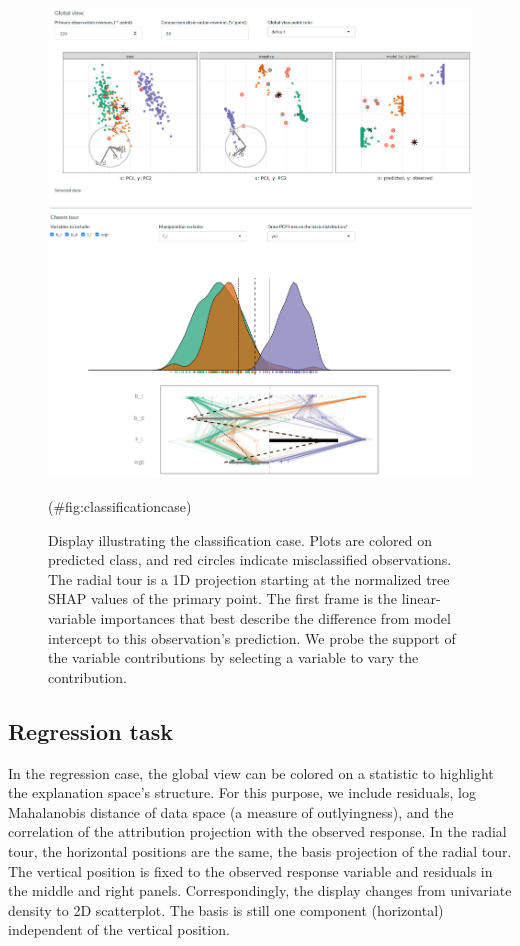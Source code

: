 \documentclass[
]{article}
\begin{document}
\begin{figure}

{\centering \includegraphics[width=1\linewidth]{./figures/app_classification} 

}

\caption{Display illustrating the classification case. Plots are colored on predicted class, and red circles indicate misclassified observations. The radial tour is a 1D projection starting at the normalized tree SHAP values of the primary point. The first frame is the linear-variable importances that best describe the difference from model intercept to this observation's prediction. We probe the support of the variable contributions by selecting a variable to vary the contribution.}(\#fig:classificationcase)
\end{figure}

\hypertarget{regression-task}{%
\subsection{Regression task}\label{regression-task}}

In the regression case, the global view can be colored on a statistic to
highlight the explanation space's structure. For this purpose, we
include residuals, log Mahalanobis distance of data space (a measure of
outlyingness), and the correlation of the attribution projection with
the observed response. In the radial tour, the horizontal positions are
the same, the basis projection of the radial tour. The vertical position
is fixed to the observed response variable and residuals in the middle
and right panels. Correspondingly, the display changes from univariate
density to 2D scatterplot. The basis is still one component (horizontal)
independent of the vertical position.
\end{document}
